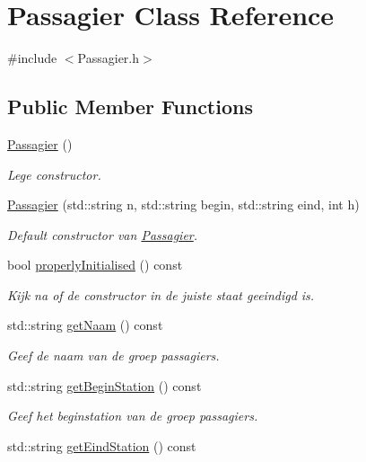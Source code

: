 \hypertarget{class_passagier}{}\section{Passagier Class Reference}
\label{class_passagier}


{\ttfamily \#include $<$Passagier.\+h$>$}

\subsection*{Public Member Functions}
\begin{DoxyCompactItemize}
\item 
\hyperlink{class_passagier_a1a2bc82f5780448cd2a9a47d08cc824f}{Passagier} ()
\begin{DoxyCompactList}\small\item\em Lege constructor. \end{DoxyCompactList}\item 
\hyperlink{class_passagier_a2f37be1d8d5fd9e6fb1dd764e348ef1a}{Passagier} (std\+::string n, std\+::string begin, std\+::string eind, int h)
\begin{DoxyCompactList}\small\item\em Default constructor van \hyperlink{class_passagier}{Passagier}. \end{DoxyCompactList}\item 
bool \hyperlink{class_passagier_ac571f017d61f182d77d1438818588539}{properly\+Initialised} () const 
\begin{DoxyCompactList}\small\item\em Kijk na of de constructor in de juiste staat geeindigd is. \end{DoxyCompactList}\item 
std\+::string \hyperlink{class_passagier_a1cc2825c750405d3782c738ac8e3e080}{get\+Naam} () const 
\begin{DoxyCompactList}\small\item\em Geef de naam van de groep passagiers. \end{DoxyCompactList}\item 
std\+::string \hyperlink{class_passagier_a46c6cfe851f62b21190bfb471d4d7b5c}{get\+Begin\+Station} () const 
\begin{DoxyCompactList}\small\item\em Geef het beginstation van de groep passagiers. \end{DoxyCompactList}\item 
std\+::string \hyperlink{class_passagier_a6d629e150c4840aa23cbeab913d369a9}{get\+Eind\+Station} () const 

\end{DoxyCompactItemize}
